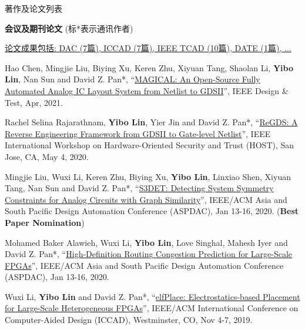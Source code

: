 \begin{rSection}{著作及论文列表}
\begin{description}[font=\normalfont, rightmargin=2em]
\end{description}
    

\textbf{会议及期刊论文} (标*表示通讯作者)
        

            \underline{论文成果包括: DAC (7篇), ICCAD (7篇), IEEE TCAD (10篇), DATE (1篇), ...} 
    

\begin{description}[font=\normalfont, rightmargin=2em]
    

\item[{[J52]}]{
        Hao Chen, Mingjie Liu, Biying Xu, Keren Zhu, Xiyuan Tang, Shaolan Li, \textbf{Yibo Lin}, Nan Sun and David Z. Pan*, 
    ``\href{https://doi.org/10.1109/MDAT.2020.3024153}{MAGICAL: An Open-Source Fully Automated Analog IC Layout System from Netlist to GDSII}'', 
    IEEE Design \& Test, Apr, 2021.
    
}
            

\item[{[C51]}]{
        Rachel Selina Rajarathnam, \textbf{Yibo Lin}, Yier Jin and David Z. Pan*, 
    ``\href{https://doi.org/10.1109/HOST45689.2020.9300272}{ReGDS: A Reverse Engineering Framework from GDSII to Gate-level Netlist}'', 
    IEEE International Workshop on Hardware-Oriented Security and Trust (HOST), San Jose, CA, May 4, 2020.
    
}
            

\item[{[C50]}]{
        Mingjie Liu, Wuxi Li, Keren Zhu, Biying Xu, \textbf{Yibo Lin}, Linxiao Shen, Xiyuan Tang, Nan Sun and David Z. Pan*, 
    ``\href{https://doi.org/10.1109/ASP-DAC47756.2020.9045109}{S3DET: Detecting System Symmetry Constraints for Analog Circuits with Graph Similarity}'', 
    IEEE/ACM Asia and South Pacific Design Automation Conference (ASPDAC), Jan 13-16, 2020.
    (\textbf{Best Paper Nomination})
}
            

\item[{[C49]}]{
        Mohamed Baker Alawieh, Wuxi Li, \textbf{Yibo Lin}, Love Singhal, Mahesh Iyer and David Z. Pan*, 
    ``\href{https://doi.org/10.1109/ASP-DAC47756.2020.9045178}{High-Definition Routing Congestion Prediction for Large-Scale FPGAs}'', 
    IEEE/ACM Asia and South Pacific Design Automation Conference (ASPDAC), Jan 13-16, 2020.
    
}
            

\item[{[C48]}]{
        Wuxi Li, \textbf{Yibo Lin} and David Z. Pan*, 
    ``\href{https://doi.org/10.1109/ICCAD45719.2019.8942075}{elfPlace: Electrostatics-based Placement for Large-Scale Heterogeneous FPGAs}'', 
    IEEE/ACM International Conference on Computer-Aided Design (ICCAD), Westminster, CO, Nov 4-7, 2019.
    
}
\end{description}
\end{rSection}
